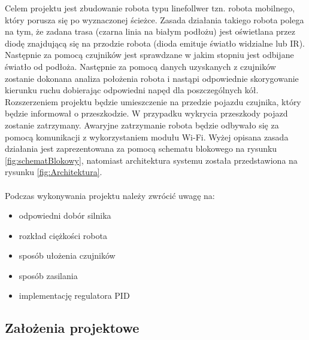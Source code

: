 \documentclass[10pt, a4paper]{article}
\begin{document}
Celem projektu jest zbudowanie robota typu linefollwer tzn. robota mobilnego, który porusza się po wyznaczonej ścieżce. Zasada działania takiego robota polega na tym, że zadana trasa (czarna linia na białym podłożu) jest oświetlana przez diodę znajdującą się na przodzie robota (dioda emituje światło widzialne lub IR). Następnie za pomocą czujników jest sprawdzane w jakim stopniu jest odbijane światło od podłoża. Następnie za pomocą danych uzyskanych z czujników zostanie dokonana analiza położenia robota i nastąpi odpowiednie skorygowanie kierunku ruchu dobierając odpowiedni napęd dla poszczególnych kół. Rozszerzeniem projektu będzie umieszczenie na przedzie pojazdu czujnika, który będzie informował o przeszkodzie. W przypadku wykrycia przeszkody pojazd zostanie zatrzymany. Awaryjne zatrzymanie robota będzie odbywało się za pomocą komunikacji z wykorzystaniem modułu Wi-Fi. Wyżej opisana zasada działania jest zaprezentowana za pomocą schematu blokowego na rysunku \ref{fig:schematBlokowy}, natomiast architektura systemu została przedstawiona na rysunku \ref{fig:Architektura}. \\ \\
Podczas wykonywania projektu należy zwrócić uwagę na:
\begin{itemize}
    \item odpowiedni dobór silnika
    \item rozkład ciężkości robota
    \item sposób ułożenia czujników
    \item sposób zasilania
    \item implementację regulatora PID
\end{itemize}

\subsection{Założenia projektowe}
\end{document}
